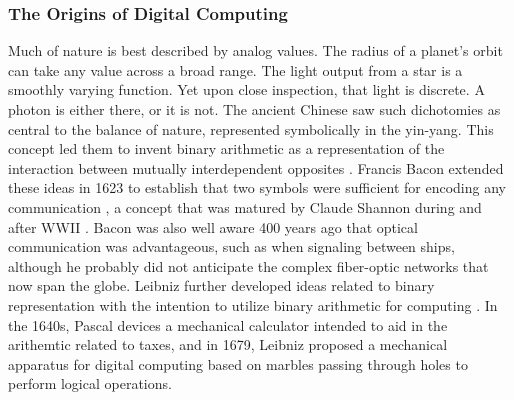 \subsubsection{The Origins of Digital Computing}
Much of nature is best described by analog values. The radius of a planet's orbit can take any value across a broad range. The light output from a star is a smoothly varying function. Yet upon close inspection, that light is discrete. A photon is either there, or it is not. The ancient Chinese saw such dichotomies as central to the balance of nature, represented symbolically in the yin-yang. This concept led them to invent binary arithmetic as a representation of the interaction between mutually interdependent opposites \cite{http://www.atimes.com/leibniz-chinese-invented-first-binary-code/}. Francis Bacon extended these ideas in 1623 to establish that two symbols were sufficient for encoding any communication \cite{dy2012}, a concept that was matured by Claude Shannon during and after WWII \cite{sh1948}. Bacon was also well aware 400 years ago that optical communication was advantageous, such as when signaling between ships, although he probably did not anticipate the complex fiber-optic networks that now span the globe. Leibniz further developed ideas related to binary representation \cite{http://www.leibniz-translations.com/binary.htm} with the intention to utilize binary arithmetic for computing \cite{https://hal.archives-ouvertes.fr/ads-00104781/document,dy2012}. In the 1640s, Pascal devices a mechanical calculator intended to aid in the arithemtic related to taxes, and in 1679, Leibniz proposed a mechanical apparatus for digital computing based on marbles passing through holes to perform logical operations.

